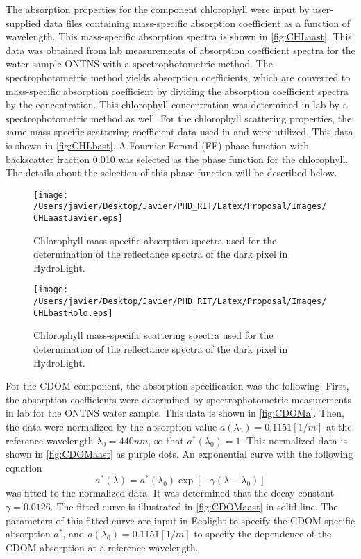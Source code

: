 The absorption properties for the component chlorophyll were input by user-supplied data files containing mass-specific absorption coefficient as a function of wavelength. This mass-specific absorption spectra is shown in \autoref{fig:CHLaast}. This data was obtained from lab measurements of absorption coefficient spectra for the water sample ONTNS with a { spectrophotometric method}. The spectrophotometric method yields absorption coefficients, which are converted to mass-specific absorption coefficient by dividing the absorption coefficient spectra by the concentration. This chlorophyll concentration was determined in lab by a { spectrophotometric method} as well. For the chlorophyll scattering properties, the same mass-specific scattering coefficient data used in \cite{Raqueno:2000} and \cite{Raqueno:2003} were utilized. This data is shown in \autoref{fig:CHLbast}. A Fournier-Forand (FF) phase function with backscatter fraction 0.010 was selected as the phase function for the chlorophyll. The details about the selection of this phase function will be described { below}.
\begin{figure}[htb]
  	\centering
  	\texttt{[image: /Users/javier/Desktop/Javier/PHD\_RIT/Latex/Proposal/Images/CHLaastJavier.eps]}
  \caption{Chlorophyll mass-specific absorption spectra used for the determination of the reflectance spectra of the dark pixel in HydroLight. \label{fig:CHLaast} } 
\end{figure}


\begin{figure}[htb]
  	\centering
  	\texttt{[image: /Users/javier/Desktop/Javier/PHD\_RIT/Latex/Proposal/Images/CHLbastRolo.eps]}
  \caption{Chlorophyll mass-specific scattering spectra used for the determination of the reflectance spectra of the dark pixel in HydroLight. \label{fig:CHLbast} } 
\end{figure}

For the CDOM component, the absorption specification was the following. First, the absorption coefficients were determined by spectrophotometric measurements in lab for the ONTNS water sample. This data is shown in \autoref{fig:CDOMa}. Then, the data were normalized by the absorption value $a(\lambda_0)=0.1151[1/m]$ at the reference wavelength $\lambda_0=440nm$, so that $a^*(\lambda_0)=1$. This normalized data is shown in \autoref{fig:CDOMaast} as purple dots. An exponential curve with the following equation
\begin{equation}
	\label{eq:CDOMabs}
	a^*(\lambda)=a^*(\lambda_0)\exp{\left[-\gamma(\lambda-\lambda_0)\right]}
\end{equation}
was fitted to the normalized data. It was determined that the decay constant $\gamma=0.0126$. The fitted curve is illustrated in \autoref{fig:CDOMaast} in solid line. The parameters of this fitted curve are input in Ecolight to specify the CDOM specific absorption $a^*$, and $a(\lambda_0)=0.1151[1/m]$ to specify the dependence of the CDOM absorption at a reference wavelength.

